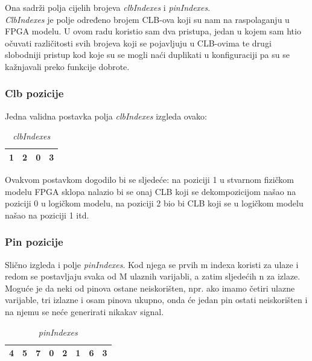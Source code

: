 \documentclass[times, utf8, zavrsni]{fer}
\begin{document}
Ona sadrži polja cijelih brojeva \emph{clbIndexes} i \emph{pinIndexes}. \\ \emph{ClbIndexes} je polje određeno brojem CLB-ova koji su nam na raspolaganju u FPGA modelu. U ovom radu koristio sam dva pristupa, jedan u kojem sam htio očuvati različitosti svih brojeva koji se pojavljuju u CLB-ovima te drugi slobodniji pristup kod koje su se mogli naći duplikati u konfiguraciji pa su se kažnjavali preko funkcije dobrote. 

\subsubsection{Clb pozicije}

Jedna validna postavka polja \emph{clbIndexes} izgleda ovako: 

\begin{table}[htb]
	\caption{\emph{clbIndexes}}
	\label{clbIndexes}
	\centering
	\begin{tabular}{|c | c | c | r|} \hline
	1 & 2 & 0 & 3 \\ \hline
	\end{tabular}
\end{table}

Ovakvom postavkom dogodilo bi se sljedeće: na poziciji 1 u stvarnom fizičkom modelu FPGA sklopa nalazio bi se onaj CLB koji se dekompozicijom našao na poziciji 0 u logičkom modelu, na poziciji 2 bio bi CLB koji se u logičkom modelu našao na poziciji 1 itd. \\

\subsubsection{Pin pozicije}

Slično izgleda i polje \emph{pinIndexes}. Kod njega se prvih m indexa koristi za ulaze i redom se postavljaju svaka od M ulaznih varijabli, a zatim sljedećih n za izlaze. Moguće je da neki od pinova ostane neiskorišten, npr. ako imamo četiri ulazne varijable, tri izlazne i osam pinova ukupno, onda će jedan pin ostati neiskorišten i na njemu se neće generirati nikakav signal. 


\begin{table}[htb]
	\caption{\emph{pinIndexes}}
	\label{pinIndexes}
	\centering
	\begin{tabular}{|c | c | c | c| c | c | c | c |} \hline
		4 & 5 & 7 & 0 & 2 & 1 & 6 & 3 \\ \hline
	\end{tabular}
\end{table}
\end{document}
